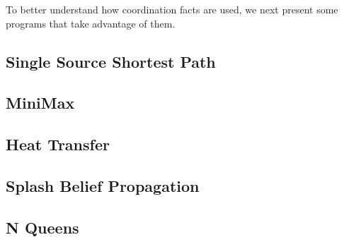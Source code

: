 
To better understand how coordination facts are used, we next present some programs that
take advantage of them.

\subsection{Single Source Shortest Path}


\subsection{MiniMax}



\subsection{Heat Transfer}



\subsection{Splash Belief Propagation}



\subsection{N Queens}
